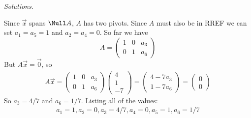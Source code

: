     \ifnum {} {\color{DarkBlue} \textit{Solutions.} 

    Since $\vec x$ spans $\Null A$, $A$ has two pivots. Since $A$ must also be in RREF we can set $a_1=a_5=1$ and $a_2=a_4 = 0$. So far we have
    $$A = \begin{pmatrix} 1&0&a_3\\0&1&a_6\end{pmatrix}$$
    But $A\vec x = \vec 0$, so 
    \begin{align}
        A\vec x = \begin{pmatrix} 1&0&a_3\\0&1&a_6\end{pmatrix}\begin{pmatrix} 4\\1\\-7\end{pmatrix} = \begin{pmatrix} 4-7a_3 \\1-7a_6 \end{pmatrix} = \begin{pmatrix} 0\\0 \end{pmatrix} 
    \end{align}
    So $a_3 = 4/7$ and $a_6 = 1/7$. Listing all of the values:
    \begin{align}
        a_1 = 1, a_2 = 0, a_3 = 4/7, a_4=0, a_5 = 1, a_6 = 1/7
    \end{align}
    } 
   \else
   \fi
\fi     


